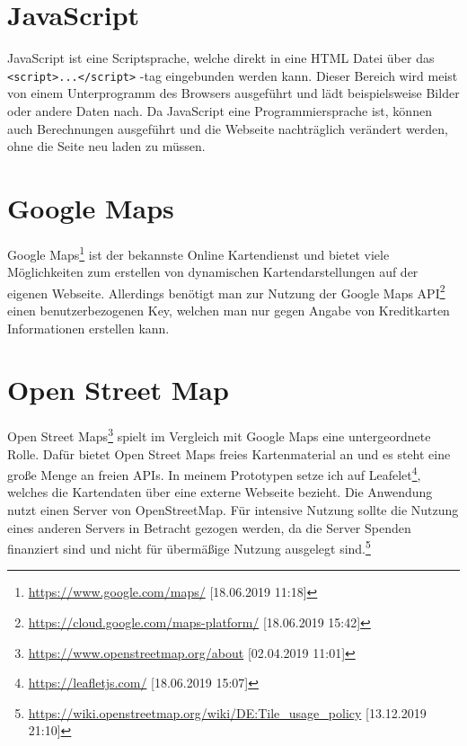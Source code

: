 \documentclass[a4paper, twoside, 12pt]{scrreprt}
\begin{document}
\section{JavaScript}
JavaScript ist eine Scriptsprache, welche direkt in eine HTML Datei über das \verb+<script>...</script>+ -tag eingebunden werden kann.
Dieser Bereich wird meist von einem Unterprogramm des Browsers ausgeführt und lädt beispielsweise Bilder oder andere Daten nach.
Da JavaScript eine Programmiersprache ist, können auch Berechnungen ausgeführt und die Webseite nachträglich verändert werden, ohne die Seite neu laden zu müssen.\cite{javascriptreferenz}
\section{Google Maps}
Google Maps\footnote{\url{https://www.google.com/maps/} [18.06.2019 11:18]} ist der bekannste Online Kartendienst und bietet viele Möglichkeiten zum erstellen von dynamischen Kartendarstellungen auf der eigenen Webseite.
Allerdings benötigt man zur Nutzung der Google Maps API\footnote{\url{https://cloud.google.com/maps-platform/} [18.06.2019 15:42]} einen benutzerbezogenen Key, welchen man nur gegen Angabe von Kreditkarten Informationen erstellen kann.
\section{Open Street Map}
Open Street Maps\footnote{\url{https://www.openstreetmap.org/about}  [02.04.2019 11:01]} spielt im Vergleich mit Google Maps eine untergeordnete Rolle.
Dafür bietet Open Street Maps freies Kartenmaterial an und es steht eine große Menge an freien APIs.
In meinem Prototypen setze ich auf Leafelet\footnote{\url{https://leafletjs.com/} [18.06.2019 15:07]}, welches die Kartendaten über eine externe Webseite bezieht.
Die Anwendung nutzt einen Server von OpenStreetMap.
Für intensive Nutzung sollte die Nutzung eines anderen Servers in Betracht gezogen werden, da die Server Spenden finanziert sind und nicht für übermäßige Nutzung ausgelegt sind.\footnote{\url{https://wiki.openstreetmap.org/wiki/DE:Tile_usage_policy} [13.12.2019 21:10]}
\end{document}
